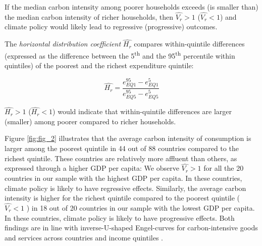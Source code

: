 \documentclass[12pt, a4paper]{article}
\begin{document}
If the median carbon intensity among poorer households exceeds (is smaller than) the median carbon intensity of richer households, then $\widehat{V_{r}}>1$ ($\widehat{V_{r}}<1$) and climate policy would likely lead to regressive (progressive) outcomes.

The \textit{horizontal distribution coefficient} $\widehat{H_{r}}$ compares within-quintile differences (expressed as the difference between the 5\textsuperscript{th} and the 95\textsuperscript{th} percentile within quintiles) of the poorest and the richest expenditure quintile:

\begin{equation}
    \widehat{H_{r}} = \frac{e_{EQ1}^{95} - e_{EQ1}^{5}}{e_{EQ5}^{95} - e_{EQ5}^{5}}
\end{equation}

$\widehat{H_{r}}>1$ ($\widehat{H_{r}}<1$) would indicate that within-quintile differences are larger (smaller) among poorer compared to richer households.

Figure \ref{fig:fig_2} illustrates that the average carbon intensity of consumption is larger among the poorest quintile in 44 out of 88 countries compared to the richest quintile. These countries are relatively more affluent than others, as expressed through a higher GDP per capita: We observe $\widehat{V_{r}}>1$ for all the 20 countries in our sample with the highest GDP per capita. In these countries, climate policy is likely to have regressive effects. Similarly, the average carbon intensity is higher for the richest quintile compared to the poorest quintile ($\widehat{V_{r}}<1$ ) in 18 out of 20 countries in our sample with the lowest GDP per capita. In these countries, climate policy is likely to have progressive effects. Both findings are in line with inverse-U-shaped Engel-curves for carbon-intensive goods and services across countries and income quintiles \autocite{Dorband.2019}. 
\end{document}
